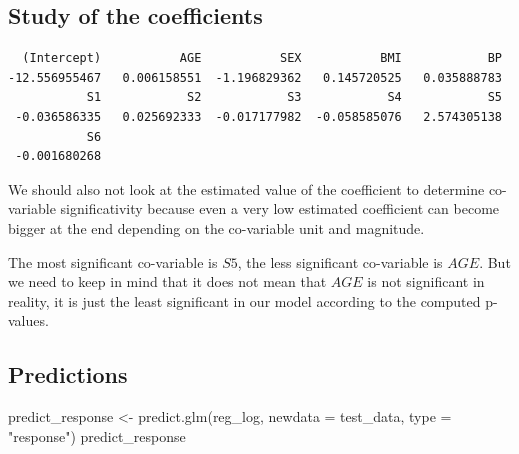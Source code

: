 \documentclass[
]{article}
\newenvironment{Shaded}{\begin{snugshade}}{\end{snugshade}}
\newcommand{\AttributeTok}[1]{\textcolor[rgb]{0.77,0.63,0.00}{#1}}
\newcommand{\FunctionTok}[1]{\textcolor[rgb]{0.00,0.00,0.00}{#1}}
\newcommand{\NormalTok}[1]{#1}
\newcommand{\OtherTok}[1]{\textcolor[rgb]{0.56,0.35,0.01}{#1}}
\newcommand{\SpecialCharTok}[1]{\textcolor[rgb]{0.00,0.00,0.00}{#1}}
\newcommand{\StringTok}[1]{\textcolor[rgb]{0.31,0.60,0.02}{#1}}
\begin{document}
\hypertarget{study-of-the-coefficients}{%
\subsection{Study of the coefficients}\label{study-of-the-coefficients}}

\begin{Shaded}
\end{Shaded}

\begin{verbatim}
  (Intercept)           AGE           SEX           BMI            BP 
-12.556955467   0.006158551  -1.196829362   0.145720525   0.035888783 
           S1            S2            S3            S4            S5 
 -0.036586335   0.025692333  -0.017177982  -0.058585076   2.574305138 
           S6 
 -0.001680268 
\end{verbatim}

We should also not look at the estimated value of the coefficient to
determine co-variable significativity because even a very low estimated
coefficient can become bigger at the end depending on the co-variable
unit and magnitude.

The most significant co-variable is \(S5\), the less significant
co-variable is \(AGE\). But we need to keep in mind that it does not
mean that \(AGE\) is not significant in reality, it is just the least
significant in our model according to the computed p-values.

\hypertarget{predictions}{%
\subsection{Predictions}\label{predictions}}

\begin{Shaded}
\begin{Highlighting}[]
\NormalTok{predict\_response }\OtherTok{\textless{}{-}} \FunctionTok{predict.glm}\NormalTok{(reg\_log, }\AttributeTok{newdata =}\NormalTok{ test\_data, }\AttributeTok{type =} \StringTok{"response"}\NormalTok{)}
\NormalTok{predict\_response}
\end{Highlighting}
\end{Shaded}
\end{document}
